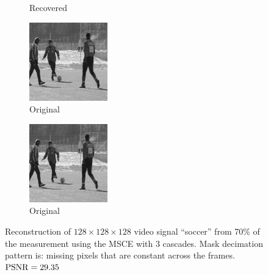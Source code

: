\begin{figure}
\begin{subfigure}{0.4\textwidth}
    \caption{Recovered}
  \end{subfigure}
  \begin{subfigure}{0.4\textwidth}
    \centering
    \includegraphics[width=.9\textwidth]{Chapter7/Images/soccer70_orig_11.png}
    \caption{Original}
  \end{subfigure}
  \begin{subfigure}{0.4\textwidth}
    \centering
    \includegraphics[width=.9\textwidth]{Chapter7/Images/soccer70_orig_12.png}
    \caption{Original}
  \end{subfigure}
  \caption{Reconstruction of $128\times 128\times 128$ video signal ``soccer'' from 70\% of the measurement using the MSCE with 3 cascades. Mask decimation pattern is: missing pixels that are constant across the frames. $\operatorname*{PSNR} = 29.35$}
\end{figure}

